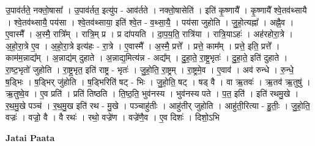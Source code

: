 \documentclass[17pt]{extarticle}
\begin{document}
उ॒पाव॑र्तते॒ नक्तो॒षासा᳚ । उ॒पाव॑र्तत॒ इत्यु॑प - आव॑र्तते । नक्तो॒षासेति॑ । इति॑ कृ॒ष्णायै᳚ । कृ॒ष्णायै᳚ श्वे॒तव॑थ्सायै । श्वे॒तव॑थ्सायै॒ पय॑सा । श्वे॒तव॑थ्साया॒ इति॑ श्वे॒त - व॒थ्सा॒यै॒ । पय॑सा जुहोति । जु॒हो॒त्यह्ना᳚ । अह्नै॒व । ए॒वास्मै᳚ । अ॒स्मै॒ रात्रि᳚म् । रात्रि॒म् प्र । प्र दा॑पयति । दा॒प॒य॒ति॒ रात्रि॑या । रात्रि॒याऽहः॑ । अह॑रहोरा॒त्रे । अ॒हो॒रा॒त्रे ए॒व । अ॒हो॒रा॒त्रे इत्य॑हः - रा॒त्रे । ए॒वास्मै᳚ । अ॒स्मै॒ प्रत्ते᳚ । प्रत्ते॒ काम᳚म् । प्रत्ते॒ इति॒ प्रत्ते᳚ । काम॑म॒न्नाद्य᳚म् । अ॒न्नाद्य॑म् दुहाते । अ॒न्नाद्य॒मित्य॑न्न - अद्य᳚म् । दु॒हा॒ते॒ रा॒ष्ट्र॒भृतः॑ । दु॒हा॒ते॒ इति॑ दुहाते । रा॒ष्ट॒भृतो॑ जुहोति । रा॒ष्ट्र॒भृत॒ इति॑ राष्ट्र - भृतः॑ । जु॒हो॒ति॒ रा॒ष्ट्रम् । रा॒ष्ट्रमे॒व । ए॒वाव॑ । अव॑ रुन्धे । रु॒न्धे॒ ष॒ड्भिः । ष॒ड्भिर् जु॑होति । ष॒ड्भिरिति॑ षट् - भिः । जु॒हो॒ति॒ षट् । षड् वै । वा ऋ॒तवः॑ । ऋ॒तव॑ ऋ॒तुषु॑ । ऋ॒तुष्वे॒व । ए॒व प्रति॑ । प्रति॑ तिष्ठति । ति॒ष्ठ॒ति॒ भुव॑नस्य । भुव॑नस्य पते । प॒त॒ इति॑ । इति॑ रथमु॒खे । र॒थ॒मु॒खे पञ्च॑ । र॒थ॒मु॒ख इति॑ रथ - मु॒खे । पञ्चाहु॑तीः । आहु॑तीर् जुहोति । आहु॑ती॒रित्या - हु॒तीः॒ । जु॒हो॒ति॒ वज्रः॑ । वज्रो॒ वै । वै रथः॑ । रथो॒ वज्रे॑ण । वज्रे॑णै॒व । ए॒व दिशः॑ । दिशो॒ऽभि \newline

\textbf{Jatai Paata} \newline
\end{document}
